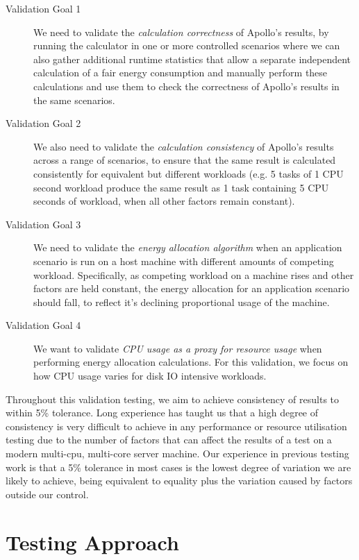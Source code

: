\begin{description}
\item [Validation Goal 1] We need to validate the \emph{calculation correctness} of Apollo's results, by running the calculator in one or more controlled scenarios where we can also gather additional runtime statistics that allow a separate independent calculation of a fair energy consumption and manually perform these calculations and use them to check the correctness of Apollo's results in the same scenarios.

\item [Validation Goal 2] We also need to validate the \emph{calculation consistency} of Apollo's results across a range of scenarios, to ensure that the same result is calculated consistently for equivalent but different workloads (e.g. 5 tasks of 1 CPU second workload produce the same result as 1 task containing 5 CPU seconds of workload, when all other factors remain constant).

\item [Validation Goal 3] We need to validate the \emph{energy allocation algorithm} when an application scenario is run on a host machine with different amounts of competing workload.  Specifically, as competing workload on a machine rises and other factors are held constant, the energy allocation for an application scenario should fall, to reflect it's declining proportional usage of the machine.

\item [Validation Goal 4] We want to validate \emph{CPU usage as a proxy for resource usage} when performing energy allocation calculations.  For this validation, we focus on how CPU usage varies for disk IO intensive workloads.

\end{description}

Throughout this validation testing, we aim to achieve consistency of results to within 5\% tolerance.  Long experience has taught us that a high degree of consistency is very difficult to achieve in any performance or resource utilisation testing due to the number of factors that can affect the results of a test on a modern multi-cpu, multi-core server machine.  Our experience in previous testing work is that a 5\% tolerance in most cases is the lowest degree of variation we are likely to achieve, being equivalent to equality plus the variation caused by factors outside our control.

\section{Testing Approach}


